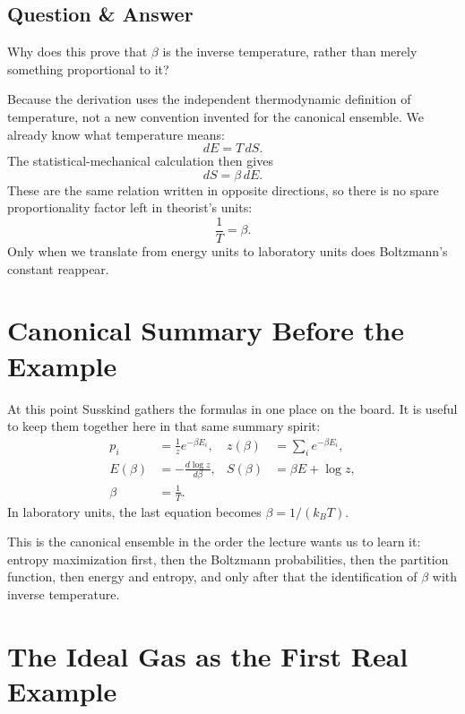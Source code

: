 \subsection{Question \& Answer}

Why does this prove that \(\beta\) is the inverse temperature, rather than merely something proportional to it?

Because the derivation uses the independent thermodynamic definition of temperature, not a new convention invented for the canonical ensemble. We already know what temperature means:
\begin{equation}
dE=T\,dS.
\end{equation}
The statistical-mechanical calculation then gives
\begin{equation}
dS=\beta\,dE.
\end{equation}
These are the same relation written in opposite directions, so there is no spare proportionality factor left in theorist's units:
\begin{equation}
\frac{1}{T}=\beta.
\end{equation}
Only when we translate from energy units to laboratory units does Boltzmann's constant reappear.

\section{Canonical Summary Before the Example}

At this point Susskind gathers the formulas in one place on the board. It is useful to keep them together here in that same summary spirit:
\begin{align}
p_i &= \frac{1}{z}e^{-\beta E_i}, &
z(\beta) &= \sum_i e^{-\beta E_i}, \\
E(\beta) &= -\frac{d\log z}{d\beta}, &
S(\beta) &= \beta E+\log z, \\
\beta &= \frac{1}{T}. &&
\end{align}
In laboratory units, the last equation becomes \(\beta=1/(k_B T)\).

This is the canonical ensemble in the order the lecture wants us to learn it: entropy maximization first, then the Boltzmann probabilities, then the partition function, then energy and entropy, and only after that the identification of \(\beta\) with inverse temperature.

\section{The Ideal Gas as the First Real Example}

